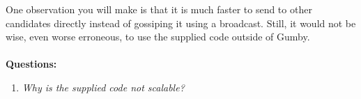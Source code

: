 \documentclass{article}
\begin{document}
One observation you will make is that it is much faster to send to other candidates directly instead of gossiping it using a broadcast.
Still, it would not be wise, even worse erroneous, to use the supplied code outside of Gumby.\\
\\
\textbf{Questions:}
\begin{enumerate}
\item \textit{Why is the supplied code not scalable?}
\end{enumerate}



{\small }
\end{document}
